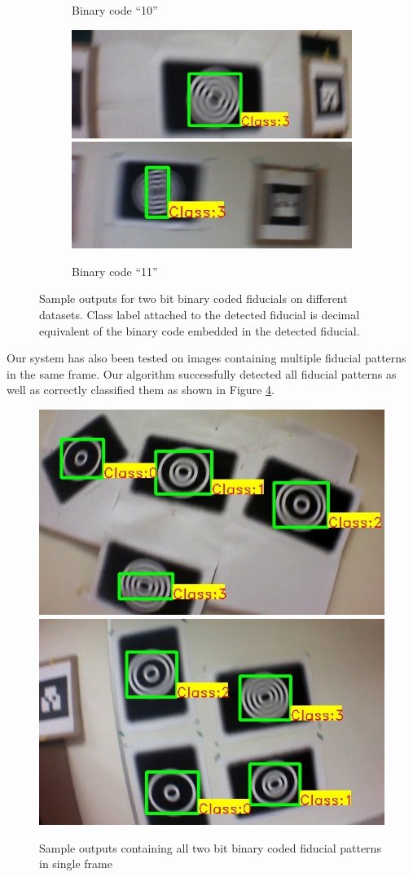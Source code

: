 \documentclass[runningheads]{llncs}
\begin{document}
\begin{figure}[hb!]
\begin{subfigure}{\textwidth}
  \caption{Binary code ``10''}
  \label{fig:output2}
\end{subfigure}
\begin{subfigure}{\textwidth}
\centering
  \includegraphics[width=0.48\linewidth]{output_11.jpg}
  \includegraphics[width=0.48\linewidth]{new_results/output_11.jpg}
  \caption{Binary code ``11''}
  \label{fig:output3}
  \end{subfigure}
  \caption{Sample outputs for two bit binary coded fiducials on different
  datasets. Class label attached to the detected fiducial is decimal equivalent
  of the binary code embedded in the detected fiducial.}
\end{figure}

Our system has also been tested on images containing multiple fiducial patterns
in the same frame. Our algorithm successfully detected all fiducial patterns as
well as correctly classified them as shown in Figure \ref{fig:output_all}.

\begin{figure}
\centering
  \includegraphics[width=.45\linewidth]{output_all_2.jpg}
  \includegraphics[width=.45\linewidth]{new_results/output_test_all1.jpg}
  \caption{Sample outputs containing all two bit binary coded fiducial patterns
  in single frame}
  \label{fig:output_all}
\end{figure}
\end{document}
